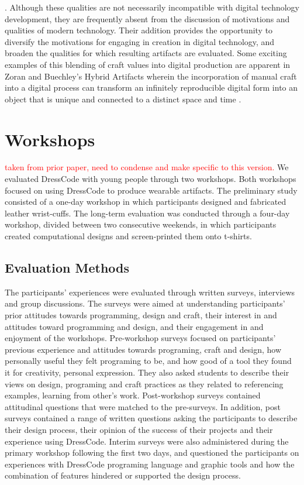 \documentclass{sigchi}
\begin{document}
\cite{pye}. Although these qualities are not necessarily incompatible with digital technology development, they are frequently absent from the discussion of motivations and qualities of modern technology. Their addition provides the opportunity to diversify the motivations for engaging in creation in digital technology, and broaden the qualities for which resulting artifacts are evaluated. Some exciting examples of this blending of craft values into digital production are apparent in Zoran and Buechley's Hybrid Artifacts wherein the incorporation of manual craft into a digital process can transform an infinitely reproducible digital form into an object that is unique and connected to a distinct space and time \cite{zoran}.


\section{Workshops}
\textcolor{red}{taken from prior paper, need to condense and make specific to this version.}
We evaluated DressCode with young people through two workshops. Both workshops focused on using DressCode to produce wearable artifacts. The preliminary study consisted of a one-day workshop in which participants designed and fabricated leather wrist-cuffs. The long-term evaluation was conducted through a four-day workshop, divided between two consecutive weekends, in which participants created computational designs and screen-printed them onto t-shirts. 

\subsection{Evaluation Methods}
The participants' experiences were evaluated through written surveys, interviews and group discussions. The surveys were aimed at understanding participants’ prior attitudes towards programming, design and craft, their interest in and attitudes toward programming and design, and their engagement in and enjoyment of the workshops. Pre-workshop surveys focused on participants’ previous experience and attitudes towards programing, craft and design, how personally useful they felt programing to be, and how good of a tool they found it for creativity, personal expression. They also asked students to describe their views on design, programing and craft practices as they related to referencing examples, learning from other's work. Post-workshop surveys contained attitudinal questions that were matched to the pre-surveys. In addition, post surveys contained a range of written questions asking the participants to describe their design process, their opinion of the success of their projects and their experience using DressCode. Interim surveys were also administered during the primary workshop following the first two days, and questioned the participants on experiences with DressCode programing language and graphic tools and how the combination of features hindered or supported the design process.
\end{document}
